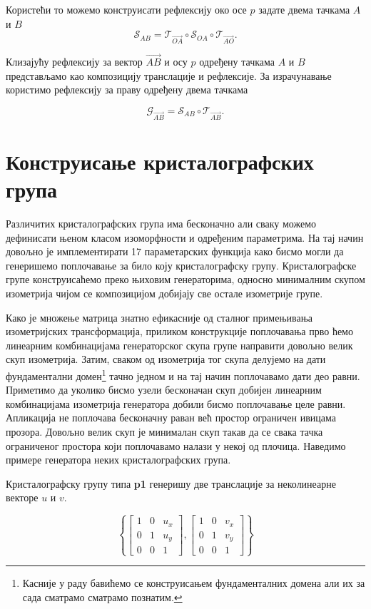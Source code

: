 \documentclass[12pt]{report}
\begin{document}
Користећи то можемо конструисати рефлексију око осе $p$ задате двема тачкама $A$ и $B$
$$ \mathcal{S}_{AB}   = \mathcal{T}_{\vec{OA}} \circ \mathcal{S}_{OA} \circ \mathcal{T}_{\vec{AO}} . $$

Клизајућу рефлексију за вектор $\vec{AB}$ и осу $p$ одређену тачкама $A$ и $B$ представљамо као композицију транслације и рефлексије. За израчунавање користимо рефлексију за праву одређену двема тачкама

$$ \mathcal{G}_{\vec{AB}} = \mathcal{S}_{AB} \circ \mathcal{T}_{\vec{AB}}.$$



\section{Конструисање кристалографских група}

Различитих кристалографских група има бесконачно али сваку можемо дефинисати њеном класом изоморфности и одређеним параметрима. На тај начин довољно је имплементирати 17 параметарских функција како бисмо могли да генеришемо поплочавање за било коју кристалографску групу. 
Кристалографске групе конструисаћемо преко њиховим генераторима, односно минималним скупом изометрија чијом се композицијом добијају све остале изометрије групе. 

Како је множење матрица знатно ефикасније од сталног примењивања  изометријских трансформација, приликом конструкције поплочавања прво ћемо линеарним комбинацијама генераторског скупа групе направити довољно велик скуп изометрија. Затим, сваком од изометрија тог скупа делујемо на дати фундаментални домен\footnote{Касније у раду бавићемо се конструисањем фундаменталних домена али их за сада сматрамо сматрамо познатим. } тачно једном и на тај начин поплочавамо дати део равни. Приметимо да уколико бисмо узели бесконачан скуп добијен линеарним комбинацијама изометрија генератора добили бисмо поплочавање целе равни.
Апликација не поплочава бесконачну раван већ простор ограничен ивицама прозора. Довољно велик скуп је  минималан скуп такав да се свака тачка ограниченог простора који поплочавамо налази у некој од плочица.
Наведимо примере генератора неких кристалографских група.





Кристалографску групу типа \textbf{p1} генеришу две транслације за неколинеарне векторе ${u}$ и ${v}$.

$$\left\{\begin{bmatrix}1 & 0 & u_x\\ 0 & 1&u_y \\ 0 & 0 & 1\end{bmatrix},  \begin{bmatrix}1 & 0 & v_x\\ 0 & 1&v_y \\ 0 & 0 & 1\end{bmatrix}\right\} $$
\end{document}
